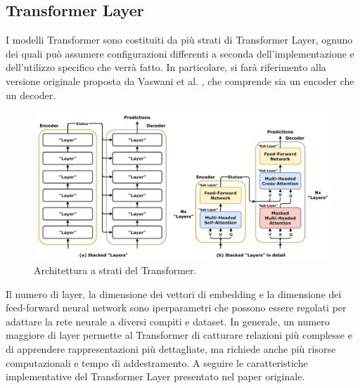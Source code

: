 \subsection{Transformer Layer}
\label{sec:transformer-layer}
I modelli Transformer sono costituiti da più strati di Transformer Layer, ognuno dei quali può assumere configurazioni differenti a seconda dell'implementazione e dell'utilizzo specifico che verrà fatto. In particolare, si farà riferimento alla versione originale proposta da Vaswani et al. \cite{vaswani2023attentionneed}, che comprende sia un encoder che un decoder.
\begin{figure}[!t]
	\centering
	\includegraphics[width=\linewidth]{Images/cap1/Transformer,_stacked_layers_and_sublayers.png}
	\caption{Architettura a strati del Transformer.}
	\label{fig:transformer-sublayers}
\end{figure}
Il numero di layer, la dimensione dei vettori di embedding e la dimensione dei feed-forward neural network sono iperparametri che possono essere regolati per adattare la rete neurale a diversi compiti e dataset.
In generale, un numero maggiore di layer permette al Transformer di catturare relazioni più complesse e di apprendere rappresentazioni più dettagliate, ma richiede anche più risorse computazionali e tempo di addestramento.
A seguire le caratteristiche implementative del Transformer Layer presentato nel paper originale.

